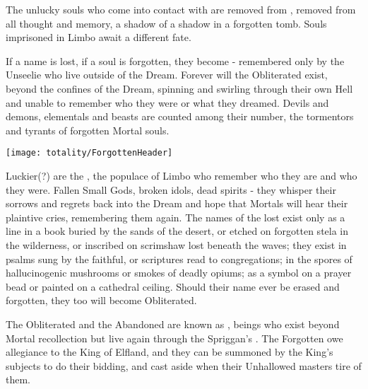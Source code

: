 



The unlucky souls who come into contact with  are removed from , removed from all thought and memory, a shadow of a shadow in a forgotten tomb. Souls imprisoned in Limbo await a different fate.

If a name is lost, if a soul is forgotten, they become  - remembered only by the Unseelie  who live outside of the Dream. Forever will the Obliterated exist, beyond the confines of the Dream, spinning and swirling through their own Hell and unable to remember who they were or what they dreamed. Devils and demons, elementals and beasts are counted among their number, the tormentors and tyrants of forgotten Mortal souls. 

\texttt{[image: totality/ForgottenHeader]}

Luckier(?) are the , the populace of Limbo who remember who they are and who they were. Fallen Small Gods, broken idols, dead spirits - they whisper their sorrows and regrets back into the Dream and hope that Mortals will hear their plaintive cries, remembering them again. The names of the lost exist only as a line in a book buried by the sands of the desert, or etched on forgotten stela in the wilderness, or inscribed on scrimshaw lost beneath the waves; they exist in psalms sung by the faithful, or scriptures read to congregations; in the spores of hallucinogenic mushrooms or smokes of deadly opiums; as a symbol on a prayer bead or painted on a cathedral ceiling. Should their name ever be erased and forgotten, they too will become Obliterated.

The Obliterated and the Abandoned are known as , beings who exist beyond Mortal recollection but live again through the Spriggan's . The Forgotten owe allegiance to the King of Elfland, and they can be summoned by the King's subjects to do their bidding, and cast aside when their Unhallowed masters tire of them.

